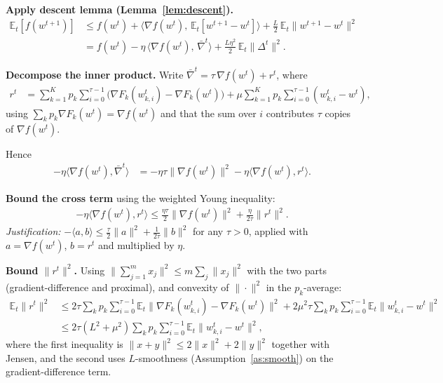 \documentclass{article}
\begin{document}
\textbf{Apply descent lemma (Lemma~\ref{lem:descent}).}
\begin{align}
\mathbb{E}_t[f(w^{t+1})]
&\le f(w^t) + \langle \nabla f(w^t),\, \mathbb{E}_t[w^{t+1}-w^t]\rangle
 + \frac{L}{2}\,\mathbb{E}_t\|w^{t+1}-w^t\|^2 \nonumber\\
&= f(w^t) - \eta\,\langle \nabla f(w^t),\, \bar\nabla^t\rangle
 + \frac{L\eta^2}{2}\,\mathbb{E}_t\|\Delta^t\|^2 .
\tag{Step 4}
\end{align}

\textbf{Decompose the inner product.} Write $\bar\nabla^t = \tau\,\nabla f(w^t) + r^t$, where
\begin{align}
r^t &= \sum_{k=1}^K p_k \sum_{i=0}^{\tau-1}\Big(\nabla F_k(w_{k,i}^t) - \nabla F_k(w^t)\Big)
 + \mu \sum_{k=1}^K p_k \sum_{i=0}^{\tau-1}(w_{k,i}^t - w^t),
\tag{Step 5}
\end{align}
using $\sum_k p_k \nabla F_k(w^t) = \nabla f(w^t)$ and that the sum over $i$ contributes $\tau$ copies of $\nabla f(w^t)$.

Hence
\begin{align}
-\eta \langle \nabla f(w^t), \bar\nabla^t\rangle
&= -\eta\tau \|\nabla f(w^t)\|^2 - \eta\langle \nabla f(w^t), r^t\rangle.
\tag{Step 6}
\end{align}

\textbf{Bound the cross term} using the weighted Young inequality:
\begin{align}
-\eta\langle \nabla f(w^t), r^t\rangle
\le \frac{\eta\tau}{2}\|\nabla f(w^t)\|^2 + \frac{\eta}{2\tau}\|r^t\|^2 .
\tag{Step 7}
\end{align}
\emph{Justification:} $-\langle a,b\rangle \le \tfrac{\tau}{2}\|a\|^2 + \tfrac{1}{2\tau}\|b\|^2$ for any $\tau>0$, applied with $a=\nabla f(w^t)$, $b=r^t$ and multiplied by $\eta$.

\textbf{Bound $\|r^t\|^2$.} Using $\|\sum_{j=1}^m x_j\|^2 \le m\sum_j\|x_j\|^2$ with the two parts (gradient-difference and proximal), and convexity of $\|\cdot\|^2$ in the $p_k$-average:
\begin{align}
\mathbb{E}_t\|r^t\|^2
&\le 2\tau \sum_{k}p_k\sum_{i=0}^{\tau-1}\mathbb{E}_t\|\nabla F_k(w_{k,i}^t)-\nabla F_k(w^t)\|^2
 + 2\mu^2 \tau \sum_k p_k \sum_{i=0}^{\tau-1}\mathbb{E}_t\|w_{k,i}^t - w^t\|^2 \nonumber\\
&\le 2\tau (L^2 + \mu^2) \sum_{k}p_k\sum_{i=0}^{\tau-1}\mathbb{E}_t\|w_{k,i}^t - w^t\|^2 ,
\tag{Step 8}
\end{align}
where the first inequality is $\|x+y\|^2\le 2\|x\|^2+2\|y\|^2$ together with Jensen, and the second uses $L$-smoothness (Assumption~\ref{as:smooth}) on the gradient-difference term.
\end{document}
